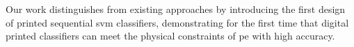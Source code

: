 Our work distinguishes from existing approaches by introducing the first design of printed sequential \gls{svm} classifiers, demonstrating for the first time that digital printed classifiers can meet the physical constraints of \gls{pe} with high accuracy.



